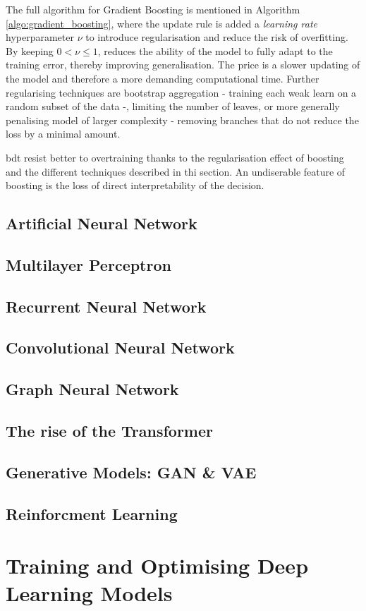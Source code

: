 The full algorithm for Gradient Boosting is mentioned in Algorithm \ref{algo:gradient_boosting}, where the update rule is added a \textit{learning rate} hyperparameter $\nu$ to introduce regularisation and reduce the risk of overfitting. By keeping $0 < \nu \leq 1$, reduces the ability of the model to fully adapt to the training error, thereby improving generalisation. The price is a slower updating of the model and therefore a more demanding computational time. Further regularising techniques are bootstrap aggregation - training each weak learn on a random subset of the data -, limiting the number of leaves, or more generally penalising model of larger complexity - removing branches that do not reduce the loss by a minimal amount. 

\gls{bdt} resist better to overtraining thanks to the regularisation effect of boosting and the different techniques described in thi section. An undiserable feature of boosting is the loss of direct interpretability of the decision. 

\subsection{Artificial Neural Network}

\subsection{Multilayer Perceptron}

\subsection{Recurrent Neural Network}

\subsection{Convolutional Neural Network}

\subsection{Graph Neural Network}

\subsection{The rise of the Transformer}

\subsection{Generative Models: GAN \& VAE}

\subsection{Reinforcment Learning}

\section{Training and Optimising Deep Learning Models}

